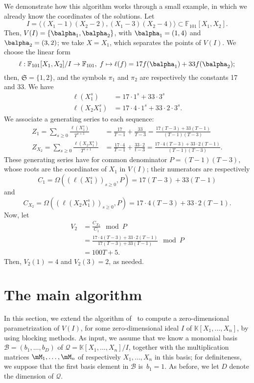 \documentclass[12pt]{article}
\newcommand{\basis}{\mathscr{B}}
\newcommand{\minpoly}{P}
\newcommand{\lf}{X}
\newcommand{\residueI}{\mathscr{Q}}
\def\F {\ensuremath{\mathbb{F}}}
\def\K{\mathbb{K}}
\def\K {\ensuremath{\mathbb{K}}}
\begin{document}
We demonstrate how this algorithm works through a small example, in 
which we already know the coordinates of the solutions. Let 
$$I = \langle (X_1-1)(X_2-2),(X_1-3)(X_2-4)\rangle \subset
\F_{101}[X_1,X_2].$$ Then, $V(I) = \{\balpha_1,\balpha_2\}$,
with $\balpha_1= (1,4)$ and $\balpha_2=(3,2)$; we take
$\lf=X_1$, which separates the points of $V(I)$.  We choose the linear form
\[
  \ell: \F_{101}[X_1,X_2]/I \to \F_{101},\;
  f \mapsto \ell(f) = 17 f(\balpha_1) + 33 f(\balpha_2);
\]
then, $\mathfrak{S}=\{1,2\}$, and the symbols $\pi_1$ and $\pi_2$ 
are respectively the constants 17 and 33. We have
\begin{align*}
\ell(X_1^s) &= 17 \cdot 1^s + 33 \cdot 3^s\\
\ell(X_2X_1^s) &= 17 \cdot 4 \cdot 1^s + 33 \cdot 2 \cdot 3^s.
\end{align*} 
We associate a generating series to each sequence:
\begin{align*}
Z_1 = \sum_{s \ge 0} \frac{\ell(X^s_1)}{T^{s+1}}
&= \frac{17}{T-1} + \frac{33}{T-3}
= \frac{17(T-3)+33(T-1)}{(T-1)(T-3)} \\
Z_{X_2} = \sum_{s\ge0} \frac{\ell(X_2X_1^s)}{T^{s+1} }
&= \frac{17\cdot 4}{T-1} + \frac{33 \cdot 2}{t-3}
= \frac{17\cdot 4 (T-3) + 33\cdot 2(T-1)}{(T-1)(T-3)}.
\end{align*}
These generating series have for common denominator $\minpoly = (T-1)(T-3)$,
whose roots are the coordinates of $X_1$ in $V(I)$;
their numerators are respectively
$$C_{1} = \Omega((\ell(X^s_1))_{s\ge 0},\minpoly) = 17 (T-3) + 33(T-1)$$
and
$$C_{X_2} = \Omega((\ell(X_2X^s_1))_{s\ge 0},\minpoly) = 17\cdot 4 (T-3) + 33\cdot 2(T-1).$$
Now, let
\begin{align*}
V_2 
&=\frac{C_{X_2}}{C_1} \mod \minpoly\\
&=\frac{17\cdot 4 (T-3) + 33\cdot 2(T-1)}{17(T-3)+33(T-1)} \mod \minpoly\\
&=100 T +5.
\end{align*}
Then, $ V_2(1) = 4$ and $V_2(3) = 2$, as needed.


\section{The main algorithm}\label{sec:main}

In this section, we extend the algorithm of~\cite{BoSaSc03} to compute
a zero-dimensional parametrization of $V(I)$, for some
zero-dimensional ideal $I$ of $\K[X_1,\dots,X_n]$, by using blocking
methods. As input, we assume that we know a monomial basis
$\basis=(b_1,\dots,b_D)$ of $\residueI=\K[X_1,\dots,X_n]/I$, together
with the multiplication matrices $\mM_1,\dots,\mM_n$ of respectively
$X_1,\dots,X_n$ in this basis; for definiteness, we suppose that the
first basis element in $\basis$ is~$b_1=1$. As before, we let $D$ denote the
dimension of $\residueI$.
\end{document}
